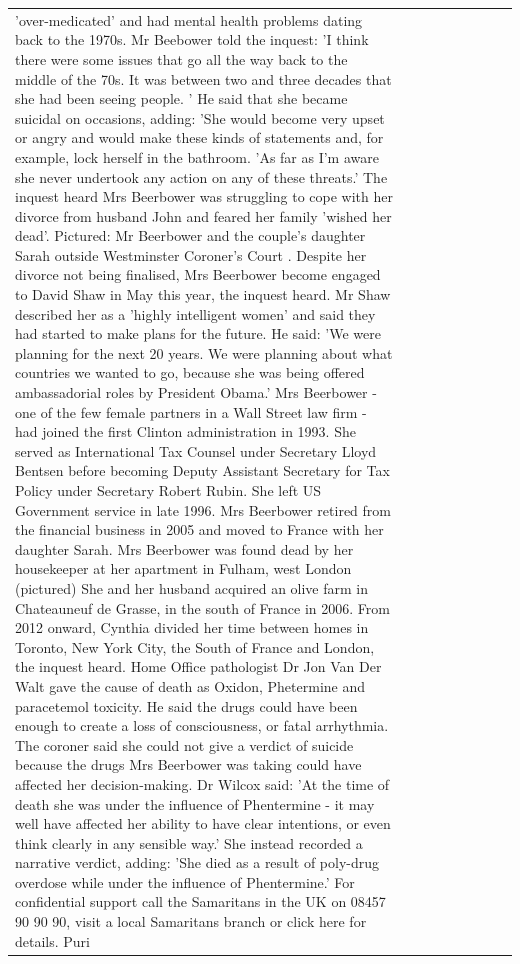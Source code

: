 \begin{table}[H]
\begin{tabular}{lllrlllll}
'over-medicated' and had mental health problems dating back to the 1970s. Mr Beebower told the inquest: 'I think there were some issues that go all the way back to the middle of the 70s. It was between two and three decades that she had been seeing people. ' He said that she became suicidal on occasions, adding: 'She would become very upset or angry and would make these kinds of statements and, for example, lock herself in the bathroom. 'As far as I'm aware she never undertook any action on any of these threats.' The inquest heard Mrs Beerbower was struggling to cope with her divorce from husband John and feared her family 'wished her dead'. Pictured: Mr Beerbower and the couple's daughter Sarah outside Westminster Coroner's Court . Despite her divorce not being finalised, Mrs Beerbower become engaged to David Shaw in May this year, the inquest heard. Mr Shaw described her as a 'highly intelligent women' and said they had started to make plans for the future. He said: 'We were planning for the next 20 years. We were planning about what countries we wanted to go, because she was being offered ambassadorial roles by President Obama.' Mrs Beerbower - one of the few female partners in a Wall Street law firm - had joined the first Clinton administration in 1993. She served as International Tax Counsel under Secretary Lloyd Bentsen before becoming Deputy Assistant Secretary for Tax Policy under Secretary Robert Rubin. She left US Government service in late 1996. Mrs Beerbower retired from the financial business in 2005 and moved to France with her daughter Sarah. Mrs Beerbower was found dead by her housekeeper at her apartment in Fulham, west London (pictured) She and her husband acquired an olive farm in Chateauneuf de Grasse, in the south of France in 2006. From 2012 onward, Cynthia divided her time between homes in Toronto, New York City, the South of France and London, the inquest heard. Home Office pathologist Dr Jon Van Der Walt gave the cause of death as Oxidon, Phetermine and paracetemol toxicity. He said the drugs could have been enough to create a loss of consciousness, or fatal arrhythmia. The coroner said she could not give a verdict of suicide because the drugs Mrs Beerbower was taking could have affected her decision-making. Dr Wilcox said: 'At the time of death she was under the influence of Phentermine - it may well have affected her ability to have clear intentions, or even think clearly in any sensible way.' She instead recorded a narrative verdict, adding: 'She died as a result of poly-drug overdose while under the influence of Phentermine.' For confidential support call the Samaritans in the UK on 08457 90 90 90, visit a local Samaritans branch or click here for details. Puri \\

\end{tabular}
\end{table}
